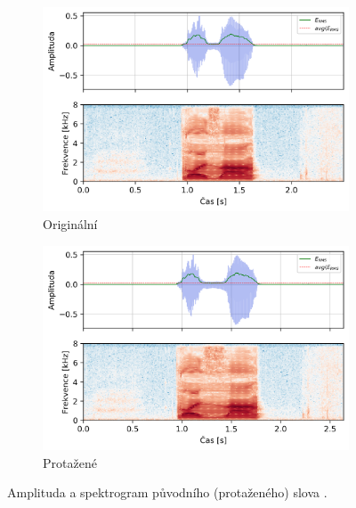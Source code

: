 \begin{figure}[htpb]
  \centering
  \begin{subfigure}[b]{0.42\textwidth}
    \includegraphics[width=\textwidth]{./ch4-experiments/img/energy_spec_word-normal.png}
    \caption{Originální}
    \label{fig:experiments:augmentation:compare:original}
  \end{subfigure}
  \begin{subfigure}[b]{0.42\textwidth}
    \includegraphics[width=\textwidth]{./ch4-experiments/img/energy_spec_word-augmented.png}
    \caption{Protažené}
    \label{fig:experiments:augmentation:compare:augmented}
  \end{subfigure}
  \caption{Amplituda a spektrogram původního (protaženého) slova .}
  \label{fig:experiments:analysis:compare}
\end{figure}


